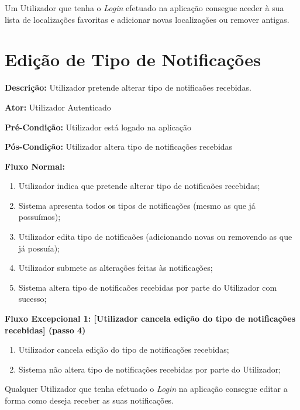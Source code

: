 \documentclass[a4paper,12pt]{scrreprt}
\newcommand{\tab}{
    \hspace{1cm}}
\begin{document}
\vspace{1.5cm}

\tab Um Utilizador que tenha o \textit{Login} efetuado na aplicação consegue aceder à sua lista de localizações favoritas e adicionar novas localizações ou remover antigas.

\clearpage

\section{Edição de Tipo de Notificações}

\textbf{Descrição: }Utilizador pretende alterar tipo de notificaões recebidas.

\textbf{Ator: }Utilizador Autenticado

\textbf{Pré-Condição: }Utilizador está logado na aplicação

\textbf{Pós-Condição: }Utilizador altera tipo de notificações recebidas

\textbf{Fluxo Normal: }
\begin{enumerate}
    \item Utilizador indica que pretende alterar tipo de notificaões recebidas;
    \item Sistema apresenta todos os tipos de notificações (mesmo as que já possuímos);
    \item Utilizador edita tipo de notificaões (adicionando novas ou removendo as que já possuía);
    \item Utilizador submete as alterações feitas às notificações;
    \item Sistema altera tipo de notificaões recebidas por parte do Utilizador com sucesso;
\end{enumerate}

\textbf{Fluxo Excepcional 1: [Utilizador cancela edição do tipo de notificações recebidas] (passo 4)}
\begin{enumerate}[label=4.\arabic*]
    \item Utilizador cancela edição do tipo de notificações recebidas;
    \item Sistema não altera tipo de notificações recebidas por parte do Utilizador;
\end{enumerate}

\vspace{1.5cm}

\tab Qualquer Utilizador que tenha efetuado o \textit{Login} na aplicação consegue editar a forma como deseja receber as suas notificações.
\end{document}
